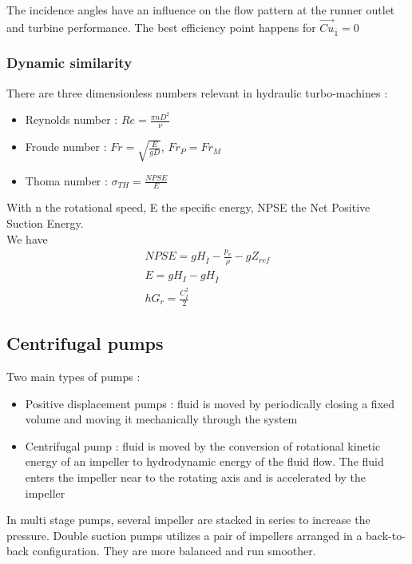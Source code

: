 \documentclass[../main.tex]{subfiles}
\begin{document}
The incidence angles have an influence on the flow pattern at the runner outlet and turbine performance. The best efficiency point happens for $\vec{Cu}_{\overline{1}} = 0$\\

\subsubsection{Dynamic similarity}
There are three dimensionless numbers relevant in hydraulic turbo-machines : \begin{itemize}
    \item Reynolds number : $Re = \frac{\pi n D^2}{\nu}$
    \item Froude number : $Fr = \sqrt{\frac{E}{gD}}$, $Fr_P = Fr_M$
    \item Thoma number : $\sigma_{TH} = \frac{NPSE}{E}$
\end{itemize}
With n the rotational speed, E the specific energy, NPSE the Net Positive Suction Energy.\\
We have \begin{equation}
\begin{gathered}
    NPSE = gH_{\overline{I}} - \frac{p_v}{\rho} - gZ_{ref}\\
    E = gH_I - gH_{\overline{I}}\\
    hG_r = \frac{C_{\overline{I}}^2}{2}
    \end{gathered}
\end{equation}

\subsection{Centrifugal pumps}
Two main types of pumps : \begin{itemize}
    \item Positive displacement pumps : fluid is moved by periodically closing a fixed volume and moving it mechanically through the system
    \item Centrifugal pump : fluid is moved by the conversion of rotational kinetic energy of an impeller to hydrodynamic energy of the fluid flow. The fluid enters the impeller near to the rotating axis and is accelerated by the impeller
\end{itemize}

In multi stage pumps, several impeller are stacked in series to increase the pressure. Double suction pumps utilizes a pair of impellers arranged in a back-to-back configuration. They are more balanced and run smoother. \\
\end{document}
